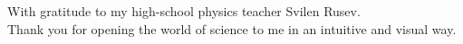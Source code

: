 \thispagestyle{empty}
{}

\vspace*{3cm}

\begin{center}
    With gratitude to my high-school physics teacher Svilen Rusev. \\Thank you for
    opening the world of science to me in an intuitive and visual way.
\end{center}

\medskip
